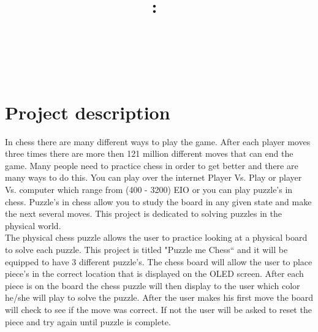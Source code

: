 \documentclass[11pt]{article}
\title{\vspace{2in}\textmd{\textbf{\hmwkClass:\ \hmwkTitle}}\\\normalsize\vspace{0.1in}\small{\hmwkDueDate}\\\vspace{0.1in}\large{\textit{\hmwkClassInstructor\ }}\vspace{3in}}
\date{}
\author{\textbf{\hmwkAuthorName}}
\begin{document}
\maketitle %
\newpage

\tableofcontents %
\newpage
\listoffigures
\listoftables
\lstlistoflistings




\clearpage 
\section{Project description}



In chess there are many different ways to play the game. After each player moves three times there are more then 121 million different moves that can end the game. Many people need to practice chess in order to get better and there are many ways to do this. You can play over the internet Player Vs. Play or player Vs. computer which range from (400 - 3200) EIO or you can play puzzle's in chess. Puzzle's in chess allow you to study the board in any given state and make the next several moves. This project is dedicated to solving puzzles in the physical world. 
\\

\noindent The physical chess puzzle allows the user to practice looking at a physical board to solve each puzzle. This project is titled "Puzzle me Chess`` and it will be equipped to have 3 different puzzle's. The chess board will allow the user to place piece's in the correct location that is displayed on the OLED screen. After each piece is on the board the chess puzzle will then display to the user which color he/she will play to solve the puzzle. After the user makes his first move the board will check to see if the move was correct. If not the user will be asked to reset the piece and try again until puzzle is complete. 
\end{document}
